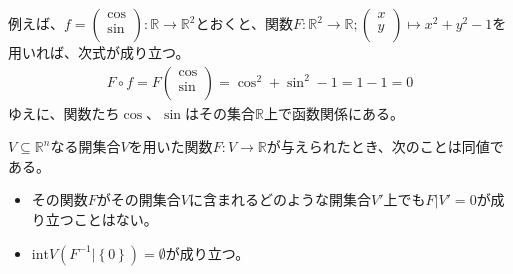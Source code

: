 \documentclass[dvipdfmx]{jsarticle}
\begin{document}
例えば、$f = \begin{pmatrix}
\cos \\
\sin \\
\end{pmatrix}:\mathbb{R} \rightarrow \mathbb{R}^{2}$とおくと、関数$F:\mathbb{R}^{2} \rightarrow \mathbb{R};\begin{pmatrix}
x \\
y \\
\end{pmatrix} \mapsto x^{2} + y^{2} - 1$を用いれば、次式が成り立つ。
\begin{align*}
F \circ f = F\begin{pmatrix}
\cos \\
\sin \\
\end{pmatrix} = \cos^{2} + \sin^{2} - 1 = 1 - 1 = 0
\end{align*}
ゆえに、関数たち$\cos$、$\sin$はその集合$\mathbb{R}$上で函数関係にある。
\begin{thm}\label{4.4.2.7}
$V \subseteq \mathbb{R}^{n}$なる開集合$V$を用いた関数$F:V \rightarrow \mathbb{R}$が与えられたとき、次のことは同値である。
\begin{itemize}
\item
  その関数$F$がその開集合$V$に含まれるどのような開集合$V'$上でも$F|V' = 0$が成り立つことはない。
\item
  $\mathrm{int}{V\left( F^{- 1}|\left\{ 0 \right\} \right)} = \emptyset$が成り立つ。
\end{itemize}
\end{thm}
\end{document}
